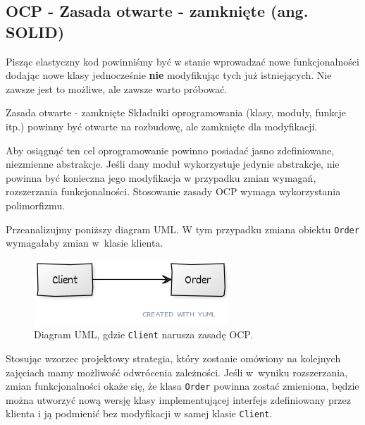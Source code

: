 \subsection{OCP - Zasada otwarte - zamknięte (ang. S\textbf{O}LID)}

Pisząc elastyczny kod powinniśmy być w stanie wprowadzać nowe funkcjonalności dodając nowe klasy jednocześnie \textbf{nie} modyfikując tych już istniejących. Nie zawsze jest to możliwe, ale zawsze warto próbować. 

\begin{myboxWithTitle}{Zasada otwarte - zamknięte}
Składniki oprogramowania (klasy, moduły, funkcje itp.) powinny być otwarte na rozbudowę, ale zamknięte dla modyfikacji.
\end{myboxWithTitle}

Aby osiągnąć ten cel oprogramowanie powinno posiadać jasno zdefiniowane, niezmienne abstrakcje. Jeśli dany moduł wykorzystuje jedynie abstrakcje, nie powinna być konieczna jego modyfikacja w przypadku zmian wymagań, rozszerzania funkcjonalności. Stosowanie zasady OCP wymaga wykorzystania polimorfizmu.

Przeanalizujmy poniższy diagram UML. W tym przypadku zmiana obiektu \texttt{Order} wymagałaby zmian w~klasie klienta. 

\begin{figure}[hbt!]
	\centering
	\includegraphics[width=0.6\linewidth]{images/SolidOcpViolationUml}
	\caption{Diagram UML, gdzie \texttt{Client} narusza zasadę OCP.}
	\label{lab1/fig/SolidOcpViolationUml}
\end{figure}

Stosując wzorzec projektowy strategia, który zostanie omówiony na kolejnych zajęciach mamy możliwość odwrócenia zależności. Jeśli w~wyniku rozszerzania, zmian funkcjonalności okaże się, że klasa \texttt{Order} powinna zostać zmieniona, będzie można utworzyć nową wersję klasy implementującej interfejs zdefiniowany przez klienta i ją podmienić bez modyfikacji w samej klasie \texttt{Client}.


